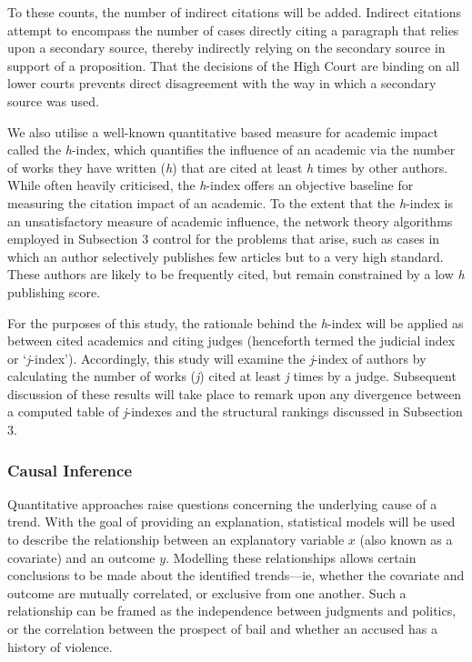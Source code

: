 To these counts, the number of indirect citations will be added. Indirect citations attempt to encompass the number of cases directly citing a paragraph that relies upon a secondary source, thereby indirectly relying on the secondary source in support of a proposition. That the decisions of the High Court are binding on all lower courts prevents direct disagreement with the way in which a secondary source was used.

We also utilise a well-known quantitative based measure for academic impact called the \emph{h}-index, which quantifies the influence of an academic via the number of works they have written (\emph{h}) that are cited at least \emph{h} times by other authors. While often heavily criticised, the \emph{h}-index offers an objective baseline for measuring the citation impact of an academic. To the extent that the \emph{h}-index is an unsatisfactory measure of academic influence, the network theory algorithms employed in Subsection 3 control for the problems that arise, such as cases in which an author selectively publishes few articles but to a very high standard. These authors are likely to be frequently cited, but remain constrained by a low \textit{h} publishing score.

For the purposes of this study, the rationale behind the \textit{h}-index will be applied as between cited academics and citing judges (henceforth termed the judicial index or `\textit{j}-index'). Accordingly, this study will examine the \emph{j}-index of authors by calculating the number of works (\textit{j}) cited at least \textit{j} times by a judge. Subsequent discussion of these results will take place to remark upon any divergence between a computed table of \emph{j}-indexes and the structural rankings discussed in Subsection 3.

\subsubsection{Causal Inference}
Quantitative approaches raise questions concerning the underlying cause of a trend. With the goal of providing an explanation, statistical models will be used to describe the relationship between an explanatory variable $x$ (also known as a covariate) and an outcome $y$. Modelling these relationships allows certain conclusions to be made about the identified trends---ie, whether the covariate and outcome are mutually correlated, or exclusive from one another. Such a relationship can be framed as the independence between judgments and politics, or the correlation between the prospect of bail and whether an accused has a history of violence.

